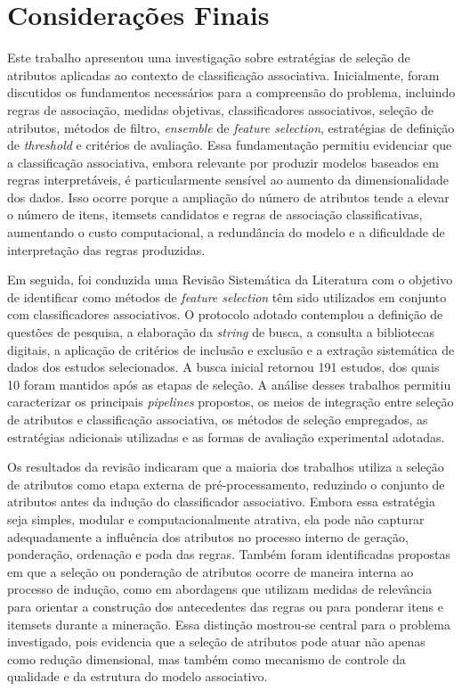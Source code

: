 \chapter{Considerações Finais}\label{cap:consideracoes-finais}

Este trabalho apresentou uma investigação sobre estratégias de seleção de atributos aplicadas ao contexto de classificação associativa. Inicialmente, foram discutidos os fundamentos necessários para a compreensão do problema, incluindo regras de associação, medidas objetivas, classificadores associativos, seleção de atributos, métodos de filtro, \textit{ensemble} de \textit{feature selection}, estratégias de definição de \textit{threshold} e critérios de avaliação. Essa fundamentação permitiu evidenciar que a classificação associativa, embora relevante por produzir modelos baseados em regras interpretáveis, é particularmente sensível ao aumento da dimensionalidade dos dados. Isso ocorre porque a ampliação do número de atributos tende a elevar o número de itens, itemsets candidatos e regras de associação classificativas, aumentando o custo computacional, a redundância do modelo e a dificuldade de interpretação das regras produzidas.

Em seguida, foi conduzida uma Revisão Sistemática da Literatura com o objetivo de identificar como métodos de \textit{feature selection} têm sido utilizados em conjunto com classificadores associativos. O protocolo adotado contemplou a definição de questões de pesquisa, a elaboração da \textit{string} de busca, a consulta a bibliotecas digitais, a aplicação de critérios de inclusão e exclusão e a extração sistemática de dados dos estudos selecionados. A busca inicial retornou 191 estudos, dos quais 10 foram mantidos após as etapas de seleção. A análise desses trabalhos permitiu caracterizar os principais \textit{pipelines} propostos, os meios de integração entre seleção de atributos e classificação associativa, os métodos de seleção empregados, as estratégias adicionais utilizadas e as formas de avaliação experimental adotadas.

Os resultados da revisão indicaram que a maioria dos trabalhos utiliza a seleção de atributos como etapa externa de pré-processamento, reduzindo o conjunto de atributos antes da indução do classificador associativo. Embora essa estratégia seja simples, modular e computacionalmente atrativa, ela pode não capturar adequadamente a influência dos atributos no processo interno de geração, ponderação, ordenação e poda das regras. Também foram identificadas propostas em que a seleção ou ponderação de atributos ocorre de maneira interna ao processo de indução, como em abordagens que utilizam medidas de relevância para orientar a construção dos antecedentes das regras ou para ponderar itens e itemsets durante a mineração. Essa distinção mostrou-se central para o problema investigado, pois evidencia que a seleção de atributos pode atuar não apenas como redução dimensional, mas também como mecanismo de controle da qualidade e da estrutura do modelo associativo.


